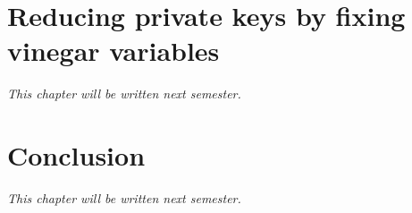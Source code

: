 \documentclass{ufsctex/ufsctex}
\begin{document}
\chapter{Reducing private keys by fixing vinegar variables}

\textit{This chapter will be written next semester.}

\chapter{Conclusion}

\textit{This chapter will be written next semester.}



\end{document}
